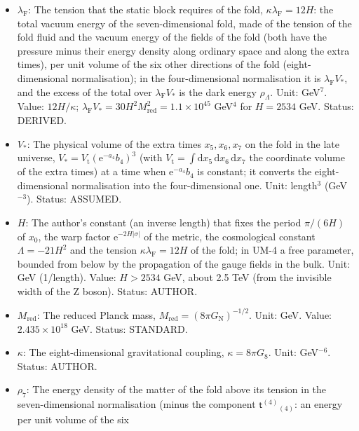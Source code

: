 \documentclass[
  10pt,
]{article}
\providecommand{\tightlist}{%
  \setlength{\itemsep}{0pt}\setlength{\parskip}{0pt}}
\begin{document}
\begin{itemize}
\tightlist
\item
  \(\lambda_{\mathrm{F}}\): The tension that the static block requires
  of the fold, \(\kappa\lambda_{\mathrm{F}} = 12H\): the total vacuum
  energy of the seven-dimensional fold, made of the tension of the fold
  fluid and the vacuum energy of the fields of the fold (both have the
  pressure minus their energy density along ordinary space and along the
  extra times), per unit volume of the six other directions of the fold
  (eight-dimensional normalisation); in the four-dimensional
  normalisation it is \(\lambda_{\mathrm{F}}V_*\), and the excess of the
  total over \(\lambda_{\mathrm{F}}V_*\) is the dark energy
  \(\rho_\Lambda\). Unit: GeV\(^7\). Value: \(12H/\kappa\);
  \(\lambda_{\mathrm{F}}V_* = 30H^2M_{\mathrm{red}}^2 = 1.1\times10^{45}\)
  GeV\(^4\) for \(H = 2534\) GeV. Status: DERIVED.
\item
  \(V_*\): The physical volume of the extra times \(x_5, x_6, x_7\) on
  the fold in the late universe,
  \(V_* = V_{\mathrm{t}}(\mathrm{e}^{-a_4}b_4)^3\) (with
  \(V_{\mathrm{t}} = \int\mathrm{d}x_5\,\mathrm{d}x_6\,\mathrm{d}x_7\)
  the coordinate volume of the extra times) at a time when
  \(\mathrm{e}^{-a_4}b_4\) is constant; it converts the
  eight-dimensional normalisation into the four-dimensional one. Unit:
  length\(^3\) (GeV\(^{-3}\)). Status: ASSUMED.
\item
  \(H\): The author's constant (an inverse length) that fixes the period
  \(\pi/(6H)\) of \(x_0\), the warp factor
  \(\mathrm{e}^{-2H\lvert\sigma\rvert}\) of the metric, the cosmological
  constant \(\Lambda = -21H^2\) and the tension
  \(\kappa\lambda_{\mathrm{F}} = 12H\) of the fold; in UM-4 a free
  parameter, bounded from below by the propagation of the gauge fields
  in the bulk. Unit: GeV (1/length). Value: \(H > 2534\) GeV, about 2.5
  TeV (from the invisible width of the Z boson). Status: AUTHOR.
\item
  \(M_{\mathrm{red}}\): The reduced Planck mass,
  \(M_{\mathrm{red}} = (8\pi G_{\mathrm{N}})^{-1/2}\). Unit: GeV. Value:
  \(2.435\times10^{18}\) GeV. Status: STANDARD.
\item
  \(\kappa\): The eight-dimensional gravitational coupling,
  \(\kappa = 8\pi G_8\). Unit: GeV\(^{-6}\). Status: AUTHOR.
\item
  \(\rho_7\): The energy density of the matter of the fold above its
  tension in the seven-dimensional normalisation (minus the component
  \(\mathsf{t}^{(4)}{}_{(4)}\): an energy per unit volume of the six

\end{itemize}
\end{document}
